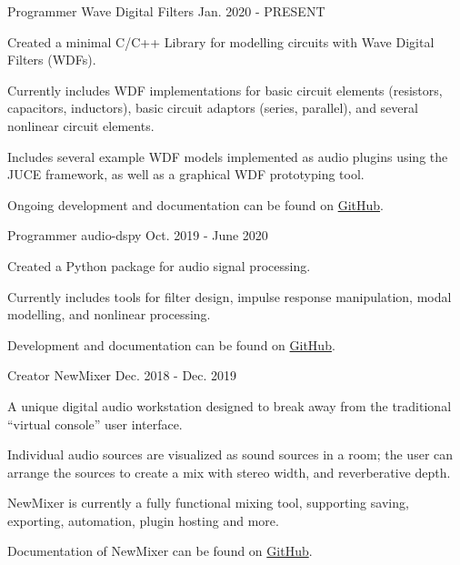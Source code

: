\begin{cventries}
  \cventry
    {Programmer} %
    {Wave Digital Filters} %
    {} %
    {Jan. 2020 - PRESENT} %
    {
      \begin{cvitems} %
        \item {Created a minimal C/C++ Library for modelling circuits with Wave Digital Filters (WDFs).}
        \item {Currently includes WDF implementations for basic circuit elements (resistors, capacitors, inductors),
               basic circuit adaptors (series, parallel), and several nonlinear circuit elements.}
        \item {Includes several example WDF models implemented as audio plugins using the JUCE framework,
               as well as a graphical WDF prototyping tool.}
        \item {Ongoing development and documentation can be found on \href{https://github.com/jatinchowdhury18/WaveDigitalFilters}{GitHub}.}
      \end{cvitems}
    }

  \cventry
    {Programmer} %
    {audio-dspy} %
    {} %
    {Oct. 2019 - June 2020} %
    {
      \begin{cvitems} %
        \item {Created a Python package for audio signal processing.}
        \item {Currently includes tools for filter design, impulse response manipulation, modal modelling, and nonlinear processing.}
        \item {Development and documentation can be found on \href{https://github.com/jatinchowdhury18/audio_dspy}{GitHub}.}
      \end{cvitems}
    }

  \cventry
    {Creator} %
    {NewMixer} %
    {} %
    {Dec. 2018 - Dec. 2019} %
    {
      \begin{cvitems} %
        \item {A unique digital audio workstation designed to break away from the traditional ``virtual console'' user interface.}
        \item {Individual audio sources are visualized as sound sources in a room; the user can arrange the sources to create a mix with stereo width, and reverberative depth.}
        \item {NewMixer is currently a fully functional mixing tool, supporting saving, exporting, automation, plugin hosting and more.}
        \item {Documentation of NewMixer can be found on \href{https://github.com/jatinchowdhury18/NewMixer}{GitHub}.}
      \end{cvitems}
    }


\end{cventries}
